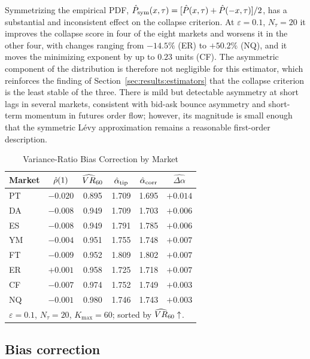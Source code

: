 \documentclass[conference]{IEEEtran}
\begin{document}
Symmetrizing the empirical PDF, $\hat{P}_{\mathrm{sym}}(x,\tau) =
[\hat{P}(x,\tau)+\hat{P}(-x,\tau)]/2$, has a substantial and inconsistent effect on
the collapse criterion. At $\varepsilon=0.1$, $N_\tau=20$ it improves the
collapse score in four of the eight markets and worsens it in the other four,
with changes ranging from $-14.5\%$ (ER) to $+50.2\%$ (NQ), and it moves the
minimizing exponent by up to $0.23$ units (CF). The asymmetric component of
the distribution is therefore not negligible for this estimator, which
reinforces the finding of Section~\ref{sec:results:estimators} that the
collapse criterion is the least stable of the three.
There is mild but detectable asymmetry at short lags in several markets,
consistent with bid-ask bounce asymmetry and short-term momentum in futures
order flow; however, its magnitude is small enough that the symmetric Lévy
approximation remains a reasonable first-order description.

\begin{table}[!t]
\begin{center}
\caption{Variance-Ratio Bias Correction by Market}
\begin{tabular}{lccccc}
\hline
Market & $\hat{\rho}(1)$ & $\widehat{VR}_{60}$ & $\hat{\alpha}_{\mathrm{tip}}$
       & $\hat{\alpha}_{\mathrm{corr}}$ & $\widehat{\Delta\alpha}$ \\
\hline
PT & $-0.020$ & 0.895 & 1.709 & 1.695 & $+0.014$ \\
DA & $-0.008$ & 0.949 & 1.709 & 1.703 & $+0.006$ \\
ES & $-0.008$ & 0.949 & 1.791 & 1.785 & $+0.006$ \\
YM & $-0.004$ & 0.951 & 1.755 & 1.748 & $+0.007$ \\
FT & $-0.009$ & 0.952 & 1.809 & 1.802 & $+0.007$ \\
ER & $+0.001$ & 0.958 & 1.725 & 1.718 & $+0.007$ \\
CF & $-0.007$ & 0.974 & 1.752 & 1.749 & $+0.003$ \\
NQ & $-0.001$ & 0.980 & 1.746 & 1.743 & $+0.003$ \\
\hline
\multicolumn{6}{l}{$\varepsilon=0.1$, $N_\tau=20$, $K_{\max}=60$; sorted by $\widehat{VR}_{60}\uparrow$.}
\end{tabular}
\label{tab:bias}
\end{center}
\end{table}

\subsection{Bias correction}
\label{sec:results:bias}
\end{document}
